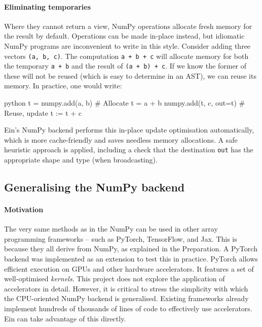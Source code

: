 \paragraph{Eliminating temporaries} Where they cannot return a view, NumPy operations allocate fresh memory for the result by default. Operations can be made in-place instead, but idiomatic NumPy programs are inconvenient to write in this style. Consider adding three vectors \texttt{(a, b, c)}. The computation \texttt{a + b + c} will allocate memory for both the temporary \texttt{a + b} and the result of \texttt{(a + b) + c}. If we know the former of these will not be reused (which is easy to determine in an AST), we can reuse its memory. In practice, one would write:
\begin{center}
\begin{cminted}{python}
t = numpy.add(a, b)     # Allocate t = a + b
numpy.add(t, c, out=t)  # Reuse, update t := t + c
\end{cminted}
\end{center}
Ein's NumPy backend performs this in-place update optimisation automatically, which is more cache-friendly and saves needless memory allocations. A safe heuristic approach is applied, including a check that the destination \texttt{out} has the appropriate shape and type (when broadcasting).

\subsection{Generalising the NumPy backend}

\paragraph{Motivation} The very same methods as in the NumPy can be used in other array programming frameworks -- such as PyTorch, TensorFlow, and Jax. This is because they all derive from NumPy, as explained in the Preparation. A PyTorch backend was implemented as an extension to test this in practice. PyTorch allows efficient execution on GPUs and other hardware accelerators. It features a set of well-optimised \textit{kernels}. This project does not explore the application of accelerators in detail. However, it is critical to stress the simplicity with which the CPU-oriented NumPy backend is generalised. Existing frameworks already implement hundreds of thousands of lines of code to effectively use accelerators. Ein can take advantage of this directly.

